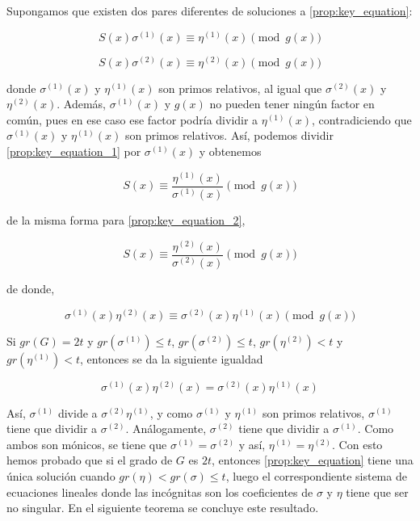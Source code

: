 Supongamos que existen dos pares diferentes de soluciones a \ref{prop:key_equation}:

\begin{equation}
    \label{prop:key_equation_1}
    S(x) \sigma^{(1)}(x) \equiv \eta^{(1)}(x) \pmod{g(x)}
\end{equation}

\begin{equation}
    \label{prop:key_equation_2}
    S(x) \sigma^{(2)}(x) \equiv \eta^{(2)}(x) \pmod{g(x)}
\end{equation}

donde $\sigma^{(1)}(x)$ y $\eta^{(1)}(x)$ son primos relativos, al igual que $\sigma^{(2)}(x)$ y $\eta^{(2)}(x)$. Además, $\sigma^{(1)}(x)$ y $g(x)$ no pueden tener ningún factor en común, pues en ese caso ese factor podría dividir a $\eta^{(1)}(x)$, contradiciendo que $\sigma^{(1)}(x)$ y $\eta^{(1)}(x)$ son primos relativos. Así, podemos dividir \ref{prop:key_equation_1} por $\sigma^{(1)}(x)$ y obtenemos

$$S(x) \equiv \frac{\eta^{(1)}(x)}{\sigma^{(1)}(x)} \pmod{g(x)}$$

de la misma forma para \ref{prop:key_equation_2},

$$S(x) \equiv \frac{\eta^{(2)}(x)}{\sigma^{(2)}(x)} \pmod{g(x)}$$

de donde,

\begin{equation}
    \label{prop:key_equation_12}
    \sigma^{(1)}(x) \eta^{(2)}(x) \equiv \sigma^{(2)}(x) \eta^{(1)}(x) \pmod{g(x)}
\end{equation}

Si $gr(G) = 2t$ y $gr(\sigma^{(1)}) \leq t$, $gr(\sigma^{(2)}) \leq t$, $gr(\eta^{(2)}) < t$ y $gr(\eta^{(1)}) < t$, entonces se da la siguiente igualdad

\begin{equation}
    \label{prop:key_equation_caso1}
    \sigma^{(1)}(x) \eta^{(2)}(x) = \sigma^{(2)}(x) \eta^{(1)}(x)
\end{equation}

Así, $\sigma^{(1)}$ divide a $\sigma^{(2)} \eta^{(1)}$, y como $\sigma^{(1)}$ y $\eta^{(1)}$ son primos relativos, $\sigma^{(1)}$ tiene que dividir a $\sigma^{(2)}$. Análogamente, $\sigma^{(2)}$ tiene que dividir a $\sigma^{(1)}$. Como ambos son mónicos, se tiene que $\sigma^{(1)} = \sigma^{(2)}$ y así, $\eta^{(1)} = \eta^{(2)}$. Con esto hemos probado que si el grado de $G$ es $2t$, entonces \ref{prop:key_equation} tiene una única solución cuando $gr(\eta) < gr(\sigma) \leq t$, luego el correspondiente sistema de ecuaciones lineales donde las incógnitas son los coeficientes de $\sigma$ y $\eta$ tiene que ser no singular. En el siguiente teorema se concluye este resultado.


